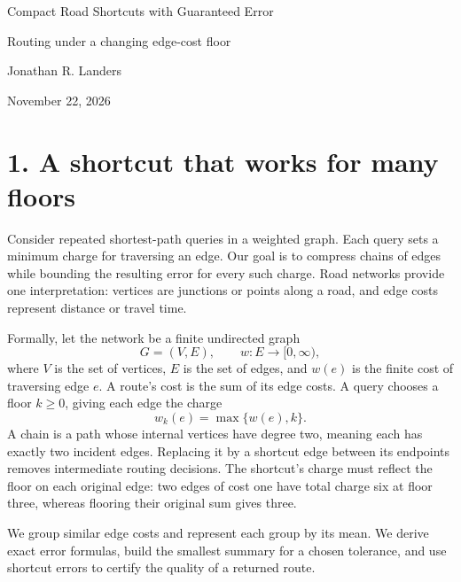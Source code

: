 \documentclass[11pt]{article}
\begin{document}
\begin{center}
{\LARGE Compact Road Shortcuts with Guaranteed Error}\par\vspace{3pt}
{\large Routing under a changing edge-cost floor}\par\vspace{5pt}
{\large Jonathan R. Landers}\par
November 22, 2026
\end{center}

\section*{1. A shortcut that works for many floors}
Consider repeated shortest-path queries in a weighted graph. Each query
sets a minimum charge for traversing an edge. Our goal is to compress
chains of edges while bounding the resulting error for every such charge.
Road networks provide one interpretation: vertices are junctions or points
along a road, and edge costs represent distance or travel time.

Formally, let the network be a finite undirected graph
\[
 G=(V,E),\qquad w:E\to[0,\infty),
\]
where $V$ is the set of vertices, $E$ is the set of edges, and $w(e)$ is
the finite cost of traversing edge $e$. A route's cost is the sum of its
edge costs. A query chooses a floor $k\ge0$, giving each edge the charge
\[
 w_k(e)=\max\{w(e),k\}.
\]
A chain is a path whose internal vertices have degree two, meaning each
has exactly two incident edges. Replacing it by a shortcut edge between
its endpoints removes intermediate routing decisions. The shortcut's charge must reflect the floor on each original
edge: two edges of cost one have total charge six at floor three, whereas
flooring their original sum gives three.

We group similar edge costs and represent each group by its mean. We derive
exact error formulas, build the smallest summary for a chosen tolerance,
and use shortcut errors to certify the quality of a returned route.
\end{document}
